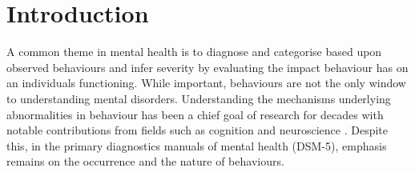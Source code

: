 \section{Introduction}

A common theme in mental health is to diagnose and categorise based upon observed behaviours and infer severity by evaluating the impact behaviour has on an individuals functioning. While important, behaviours are not the only window to understanding mental disorders. Understanding the mechanisms underlying abnormalities in behaviour has been a chief goal of research for decades with notable contributions from fields such as cognition and neuroscience \cite{Frank_2015}. Despite this, in the primary diagnostics manuals of mental health (DSM-5), emphasis remains on the occurrence and the nature of behaviours. 